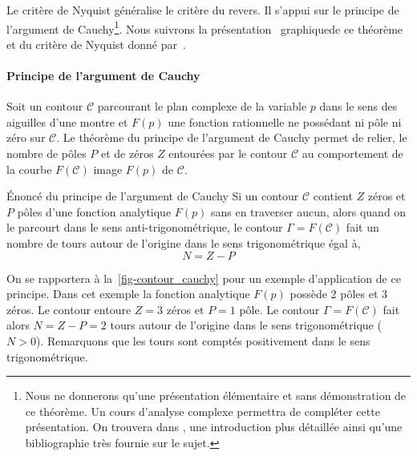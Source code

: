 Le critère de Nyquist généralise le critère du revers.
Il s'appui sur le principe de l'argument de Cauchy\footnote{Nous ne donnerons qu'une 
présentation élémentaire et sans démonstration
de ce théorème. Un cours d'analyse complexe permettra de compléter cette présentation. On 
trouvera dans \cite{laas_pc7bis,reg}, 
une introduction plus détaillée ainsi qu'une bibliographie très fournie sur le sujet.}.
Nous suivrons la présentation \og~graphique\fg de ce théorème et du critère de Nyquist donné par~\cite{reg}. 

\paragraph{Principe de l'argument de Cauchy}

Soit un contour $\mathcal{C}$ parcourant le plan complexe de 
la variable $p$ dans le sens des aiguilles d'une montre et $F(p)$ une fonction rationnelle 
ne possédant ni pôle ni zéro sur $\mathcal{C}$. Le théorème du principe de 
l'argument de Cauchy permet de relier, le nombre de pôles $P$ et de zéros $Z$ entourées par le contour $\mathcal{C}$ 
au comportement de la courbe $F(\mathcal{C})$ image $F(p)$ de $\mathcal{C}$.

\begin{theorem}{\'Enoncé du principe de l'argument de Cauchy} 
    Si un contour $\mathcal{C}$ contient $Z$ zéros et $P$ pôles d'une fonction analytique $F(p)$ 
    sans en traverser aucun, alors quand on le parcourt dans le sens anti-trigonométrique, le contour $\Gamma=F(\mathcal{C})$ 
    fait un nombre de tours autour de l'origine dans le sens trigonométrique égal à,
    $$
    N=Z-P
    $$
\end{theorem}

On se rapportera à la~\cref{fig-contour_cauchy} pour un exemple d'application de ce principe.
Dans cet exemple la fonction analytique $F(p)$ possède 2 pôles 
et 3 zéros. Le contour entoure $Z=3$ zéros et $P=1$ pôle.
Le contour $\Gamma=F(\mathcal{C})$ fait alors $N=Z-P=2$ tours autour 
de l'origine dans le sens trigonométrique ($N>0$). Remarquons que les tours sont 
comptés positivement dans le sens trigonométrique.

